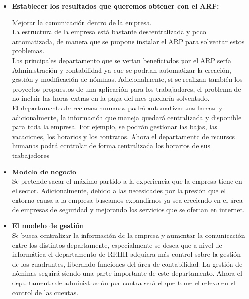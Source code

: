 \documentclass[12pt,letterpaper]{article}
\begin{document}
	
	\begin{itemize}%
		\item \textbf{Establecer los resultados que queremos obtener con el ARP:}
		
		
	  Mejorar la comunicación dentro de la empresa.\\La estructura de la empresa está bastante descentralizada y poco automatizada, de manera que se propone instalar el ARP para solventar estos problemas.\\Los principales departamento que se verían beneficiados por el ARP sería: Administración y contabilidad ya que se podrían automatizar la creación, gestión y modificación de nóminas. Adicionalmente, si se realizan también los proyectos propuestos de una aplicación para los trabajadores, el problema de no incluir las horas extras en la paga del mes quedaría solventado.\\ 
	  El departamento de recursos humanos podrá automatizar sus tareas, y adicionalmente, la información que maneja quedará centralizada y disponible para toda la empresa. Por ejemplo, se podrán gestionar las bajas, las vacaciones, los horarios y los contratos. Ahora el departamento de recursos  humanos podrá controlar de forma centralizada los horarios de sus trabajadores.
	  
	  \item \textbf{Modelo de negocio}\\
	  Se pretende sacar el máximo partido a la experiencia que la empresa tiene en el sector. Adicionalmente, debido a las necesidades por la presión que el entorno causa a la empresa buscamos expandirnos ya sea creciendo en el área de empresas de seguridad y mejorando los servicios que se ofertan en internet.
	  
	  \item \textbf{El modelo de gestión}\\
	  Se busca centralizar la información de la empresa y aumentar la comunicación entre los distintos departamente, especialmente se desea que a nivel de informática el departamento de RRHH adquiera más control sobre la gestión de los cuadrantes, liberando funciones del área de contabilidad. La gestión de nóminas seguirá siendo una parte importante de este departamento.
	  Ahora el departamento de administración por contra será el que tome el relevo en el control de las cuentas.
	  

\end{itemize}
\end{document}
